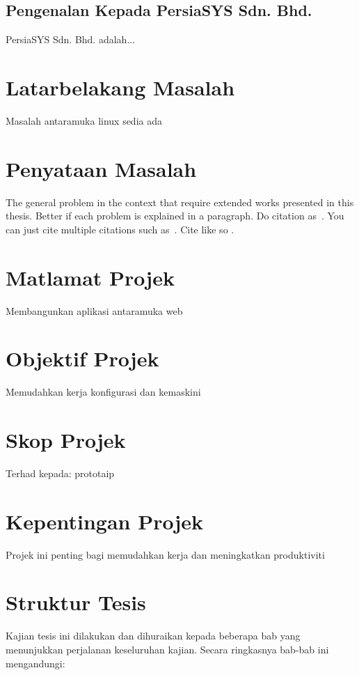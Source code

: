 \subsection{Pengenalan Kepada PersiaSYS Sdn. Bhd.}%
PersiaSYS Sdn. Bhd. adalah...

\section{Latarbelakang Masalah}
Masalah antaramuka linux sedia ada

\section{Penyataan Masalah}
The general problem in the context that require extended works
presented in this thesis. Better if each problem is explained in a
paragraph. Do citation as~\cite{b1}. You can just cite multiple
citations such as~\cite{j1, c1, w1}. Cite like so \cite{b1}.

\section{Matlamat Projek}
Membangunkan aplikasi antaramuka web

\section{Objektif Projek}
Memudahkan kerja konfigurasi dan kemaskini

\section{Skop Projek}
Terhad kepada:
prototaip

\section{Kepentingan Projek}
Projek ini penting bagi memudahkan kerja dan meningkatkan produktiviti

\section{Struktur Tesis}
Kajian tesis ini dilakukan dan dihuraikan kepada beberapa bab yang menunjukkan perjalanan keseluruhan kajian. Secara ringkasnya bab-bab ini mengandungi:
\bgroup
\renewcommand\theenumi{\roman{enumi}}

